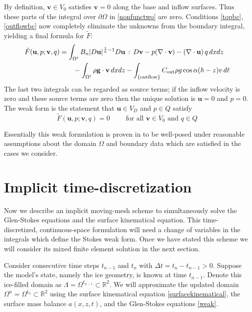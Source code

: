 \documentclass[letterpaper,final,12pt,reqno]{amsart}
\newcommand{\RR}{\mathbb{R}}
\newcommand{\bu}{\mathbf{u}}
\newcommand{\bv}{\mathbf{v}}
\begin{document}
By definition, $\bv\in V_0$ satisfies $\bv=0$ along the base and inflow surfaces.  Thus these parts of the integral over $\partial\Omega$ in \eqref{nonfunctwo} are zero.  Conditions \eqref{topbc}, \eqref{outflowbc} now completely eliminate the unknowns from the boundary integral, yielding a final formula for $\tilde F$:
\begin{align}
\tilde F(\bu,p;\bv,q) &= \int_{\Omega^t} B_n |D\bu|^{\frac{1}{n} - 1} D\bu\,:\,D\bv - p (\nabla \cdot \bv) - \left(\nabla \cdot \bu\right) q \,dx dz \label{defineF} \\
    &\qquad  - \int_{\Omega^t} \rho \mathbf{g} \cdot \bv \,dx dz - \int_{\{\text{outflow}\}} C_{\text{out}} \rho g \cos\alpha (h-z) v \,d\ell \notag
\end{align}
The last two integrals can be regarded as source terms; if the inflow velocity is zero and these source terms are zero then the unique solution is $\bu=0$ and $p=0$.  The weak form is the statement that $\bu\in V_D$ and $p\in Q$ satisfy
\begin{equation}
\tilde F(\bu,p;\bv,q) = 0 \qquad \text{ for all } \bv\in V_0 \text{ and } q\in Q  \label{weak}
\end{equation}

Essentially this weak formulation is proven in \cite[Theorem 3.8]{JouvetRappaz2011} to be well-posed under reasonable assumptions about the domain $\Omega$ and boundary data which are satisfied in the cases we consider.


\section{Implicit time-discretization} \label{sec:implicitstep}

Now we describe an implicit moving-mesh scheme to simultaneously solve the Glen-Stokes equations and the surface kinematical equation.  This time-discretized, continuous-space formulation will need a change of variables in the integrals which define the Stokes weak form.  Once we have stated this scheme we will consider its mixed finite element solution in the next section.

Consider consecutive time steps $t_{n-1}$ and $t_n$ with $\Delta t = t_n - t_{n-1} > 0$.  Suppose the model's state, namely the ice geometry, is known at time $t_{n-1}$.  Denote this ice-filled domain as $\Lambda = \Omega^{t_{n-1}} \subset \RR^2$.  We will approximate the updated domain $\Omega^n = \Omega^{t_n} \subset \RR^2$ using the surface kinematical equation \eqref{surfacekinematical}, the surface mass balance $a(x,z,t)$, and the Glen-Stokes equations \eqref{weak}.
\end{document}

